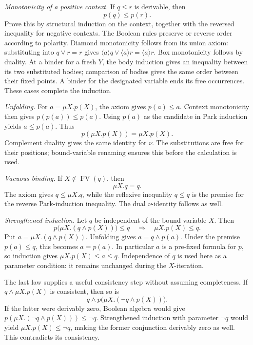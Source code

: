 \emph{Monotonicity of a positive context.}
If \(q\leq r\) is derivable, then
\[
 p(q)\leq p(r).
\]
Prove this by structural induction on the context,
together with the reversed inequality for negative
contexts. The Boolean rules preserve or reverse
order according to polarity. Diamond monotonicity
follows from its union axiom: substituting into
\(q\lor r=r\) gives
\(\langle a\rangle q\lor\langle a\rangle r
 =\langle a\rangle r\). Box monotonicity follows by
duality. At a binder for a fresh \(Y\), the body
induction gives an inequality between its two
substituted bodies; comparison of bodies gives
the same order between their fixed points.
A binder for the designated variable ends its
free occurrences. These cases complete the induction.

\emph{Unfolding.}
For \(a=\mu X.p(X)\), the axiom gives \(p(a)\leq a\).
Context monotonicity then gives \(p(p(a))\leq p(a)\).
Using \(p(a)\) as the candidate in Park induction
yields \(a\leq p(a)\). Thus
\[
 p(\mu X.p(X))=\mu X.p(X).
\]
Complement duality gives the same identity for \(\nu\).
The substitutions are free for their positions;
bound-variable renaming ensures this before the
calculation is used.

\emph{Vacuous binding.}
If \(X\notin\operatorname{FV}(q)\), then
\[
 \mu X.q=q.
\]
The axiom gives \(q\leq\mu X.q\), while the reflexive
inequality \(q\leq q\) is the premise for the reverse
Park-induction inequality. The dual \(\nu\)-identity
follows as well.

\emph{Strengthened induction.}
Let \(q\) be independent of the bound variable \(X\).
Then
\[
 p\bigl(\mu X.(q\land p(X))\bigr)\leq q
 \quad\Longrightarrow\quad
 \mu X.p(X)\leq q.
\]
Put \(a=\mu X.(q\land p(X))\). Unfolding gives
\(a=q\land p(a)\). Under the premise \(p(a)\leq q\),
this becomes \(a=p(a)\). In particular \(a\) is a
pre-fixed formula for \(p\), so induction gives
\(\mu X.p(X)\leq a\leq q\).
Independence of \(q\) is used here as a parameter
condition: it remains unchanged during the \(X\)-iteration.

The last law supplies a useful consistency step without
assuming completeness. If \(q\land\mu X.p(X)\) is
consistent, then so is
\[
 q\land p\bigl(\mu X.(\neg q\land p(X))\bigr).
\]
If the latter were derivably zero, Boolean algebra
would give
\(p(\mu X.(\neg q\land p(X)))\leq\neg q\).
Strengthened induction with parameter \(\neg q\)
would yield \(\mu X.p(X)\leq\neg q\), making
the former conjunction derivably zero as well.
This contradicts its consistency.

